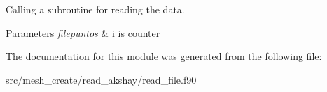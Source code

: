 Calling a subroutine for reading the data. 


\begin{DoxyParams}{Parameters}
{\em filepuntos} & i is counter \\
\hline
\end{DoxyParams}


The documentation for this module was generated from the following file\-:\begin{DoxyCompactItemize}
\item 
src/mesh\-\_\-create/read\-\_\-akshay/read\-\_\-file.\-f90\end{DoxyCompactItemize}
